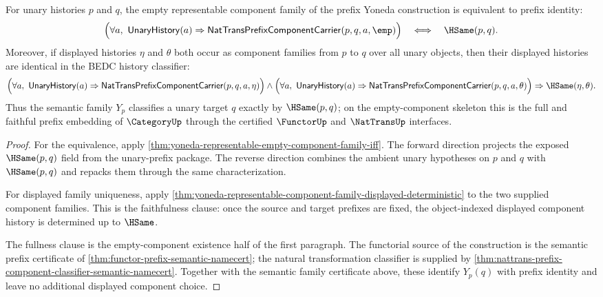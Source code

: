 \begin{theorem}
\label{thm:yoneda-prefix-empty-component-full-faithfulness}
For unary histories $p$ and $q$, the empty representable component family of
the prefix Yoneda construction is equivalent to prefix identity:
$$
\Bigl(\forall a,\ \mathsf{UnaryHistory}(a)\Rightarrow
\mathsf{NatTransPrefixComponentCarrier}(p,q,a,\emp)\Bigr)
\quad\Longleftrightarrow\quad
\HSame(p,q).
$$
Moreover, if displayed histories $\eta$ and $\theta$ both occur as component
families from $p$ to $q$ over all unary objects, then their displayed histories
are identical in the BEDC history classifier:
$$
\Bigl(\forall a,\ \mathsf{UnaryHistory}(a)\Rightarrow
\mathsf{NatTransPrefixComponentCarrier}(p,q,a,\eta)\Bigr)
\wedge
\Bigl(\forall a,\ \mathsf{UnaryHistory}(a)\Rightarrow
\mathsf{NatTransPrefixComponentCarrier}(p,q,a,\theta)\Bigr)
\Rightarrow \HSame(\eta,\theta).
$$
Thus the semantic family $Y_p$ classifies a unary target $q$ exactly by
$\HSame(p,q)$; on the empty-component skeleton this is the full and faithful
prefix embedding of $\CategoryUp$ through the certified $\FunctorUp$ and
$\NatTransUp$ interfaces.
\end{theorem}
\begin{proof}
For the equivalence, apply
\autoref{thm:yoneda-representable-empty-component-family-iff}. The forward
direction projects the exposed $\HSame(p,q)$ field from the unary-prefix
package. The reverse direction combines the ambient unary hypotheses on $p$ and
$q$ with $\HSame(p,q)$ and repacks them through the same characterization.

For displayed family uniqueness, apply
\autoref{thm:yoneda-representable-component-family-displayed-deterministic} to
the two supplied component families. This is the faithfulness clause: once the
source and target prefixes are fixed, the object-indexed displayed component
history is determined up to $\HSame$.

The fullness clause is the empty-component existence half of the first
paragraph. The functorial source of the construction is the semantic prefix
certificate of \autoref{thm:functor-prefix-semantic-namecert}; the natural
transformation classifier is supplied by
\autoref{thm:nattrans-prefix-component-classifier-semantic-namecert}. Together
with the semantic family certificate above, these identify $Y_p(q)$ with prefix
identity and leave no additional displayed component choice.
\end{proof}

